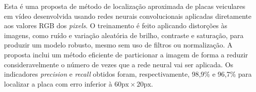 
Esta é uma proposta de método de localização aproximada de placas veiculares
em vídeo desenvolvida usando redes neurais convolucionais aplicadas diretamente
aos valores RGB dos \emph{pixels}. O treinamento é feito aplicando distorções
às imagens, como
ruído e variação aleatória de brilho, contraste e saturação, para produzir um
modelo robusto, mesmo sem uso de filtros ou normalização. A proposta inclui um
método eficiente de particionar a imagem de forma a reduzir consideravelmente o
número de vezes que a rede neural vai ser aplicada. Os indicadores
\emph{precision}
e \emph{recall} obtidos foram, respectivamente, 98,9\% e 96,7\% para localizar
a placa com erro inferior à $60\text{px} \times 20\text{px}$.
